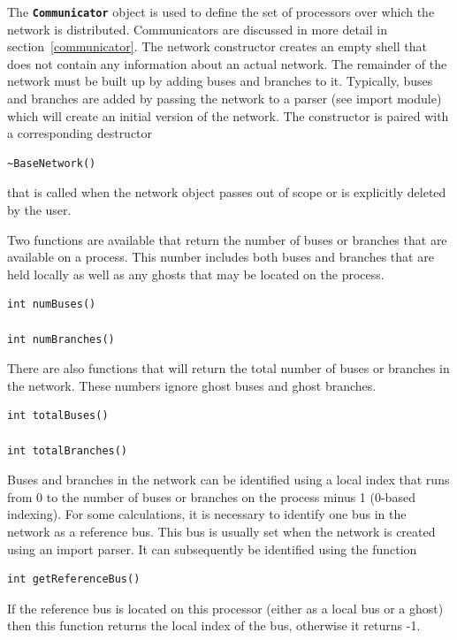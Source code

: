 The \texttt{\textbf{Communicator}} object is used to define the set of
processors over which the network is distributed. Communicators are discussed in
more detail in section~\ref{communicator}. The network constructor creates an empty shell that does not contain any information about an actual network. The remainder of the network must be built up by adding buses and branches to it. Typically, buses and branches are added by passing the network to a parser (see import module) which will create an initial version of the network. The constructor is paired with a corresponding destructor

{
\color{red}
\begin{Verbatim}[fontseries=b]
~BaseNetwork()
\end{Verbatim}
}

that is called when the network object passes out of scope or is explicitly deleted by the user.

Two functions are available that return the number of buses or branches that are available on a process. This number includes both buses and branches that are held locally as well as any ghosts that may be located on the process.

{
\color{red}
\begin{Verbatim}[fontseries=b]
int numBuses()

int numBranches()
\end{Verbatim}
}

There are also functions that will return the total number of buses or branches in the network. These numbers ignore ghost buses and ghost branches.

{
\color{red}
\begin{Verbatim}[fontseries=b]
int totalBuses()

int totalBranches()
\end{Verbatim}
}

Buses and branches in the network can be identified using a local index that runs from 0 to the number of buses or branches on the process minus 1 (0-based indexing). For some calculations, it is necessary to identify one bus in the network as a reference bus. This bus is usually set when the network is created using an import parser. It can subsequently be identified using the function

{
\color{red}
\begin{Verbatim}[fontseries=b]
int getReferenceBus()
\end{Verbatim}
}

If the reference bus is located on this processor (either as a local bus or a ghost) then this function returns the local index of the bus, otherwise it returns -1.

